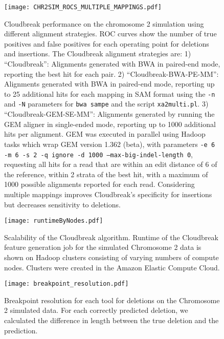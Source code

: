 \documentclass[11pt]{article}
\begin{document}
\begin{figure}
\centering
\texttt{[image: CHR2SIM\_ROCS\_MULTIPLE\_MAPPINGS.pdf]}
\caption{Cloudbreak performance on the chromosome 2 simulation using different alignment strategies. ROC curves show the number of true positives and false positives for each operating point for deletions and insertions. The Cloudbreak alignment strategies are: 1) ``Cloudbreak'': Alignments generated with BWA in paired-end mode, reporting the best hit for each pair. 2) ``Cloudbreak-BWA-PE-MM'': Alignments generated with BWA in paired-end mode, reporting up to 25 additional hits for each mapping in SAM format using the \texttt{-n} and \texttt{-N} parameters for \texttt{bwa sampe} and the script \texttt{xa2multi.pl}. 3) ``Cloudbreak-GEM-SE-MM'': Alignments generated by running the GEM aligner in single-ended mode, reporting up to 1000 additional hits per alignment. GEM was executed in parallel using Hadoop tasks which wrap GEM version 1.362 (beta), with parameters \texttt{-e 6 -m 6 -s 2 -q ignore -d 1000 --max-big-indel-length 0},  requesting all hits for a read that are within an edit distance of 6 of the reference, within 2 strata of the best hit, with a maximum of 1000 possible alignments reported for each read. Considering multiple mappings improves Cloudbreak's specificity for insertions but decreases sensitivity to deletions.}
\label{alignment_comparison}
\end{figure}

\clearpage

\begin{figure}
\centering
\texttt{[image: runtimeByNodes.pdf]}
\caption{Scalability of the Cloudbreak algorithm. Runtime of the Cloudbreak feature generation job for the simulated Chromosome 2 data is shown on Hadoop clusters consisting of varying numbers of compute nodes. Clusters were created in the Amazon Elastic Compute Cloud.}
\label{scalability}
\end{figure}

\clearpage

\begin{figure}
\centering
\texttt{[image: breakpoint\_resolution.pdf]}
\caption{Breakpoint resolution for each tool for deletions on the Chromosome 2 simulated data. For each correctly predicted deletion, we calculated the difference in length between the true deletion and the prediction.}
\label{breakpoint_resolution}
\end{figure}

\clearpage
\end{document}
